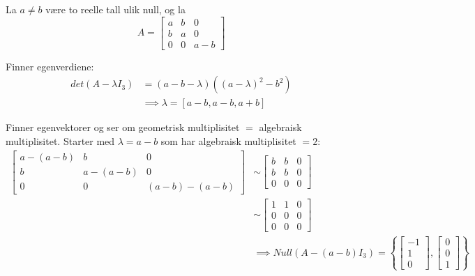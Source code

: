 \documentclass[11pt, a4paper, norsk]{NTNUoving}
\begin{document}
    \begin{oppgave}
        La $a \neq b$ være to reelle tall ulik null, og la $$A = \begin{bmatrix}
            a & b & 0 \\
            b & a & 0 \\
            0 & 0 & a-b
        \end{bmatrix}$$

        Finner egenverdiene:
        \begin{align*}
            det(A - \lambda I_3) &= (a-b-\lambda)((a-\lambda)^2 -b^2)
            \\
                                 &\implies \lambda = [a-b, a-b, a+b]
        \end{align*}
        
        Finner egenvektorer og ser om geometrisk multiplisitet $=$ algebraisk multiplisitet. Starter med $\lambda = a-b$ som har algebraisk multiplisitet $= 2$:
        \begin{align*}
            \begin{bmatrix}
                a-(a-b) & b & 0 \\
                b & a-(a-b) & 0 \\
                0 & 0 & (a-b)-(a-b)
            \end{bmatrix} &\sim \begin{bmatrix}
            b & b & 0 \\
            b & b & 0 \\
            0 & 0 & 0
            \end{bmatrix}
            \\
            &\sim \begin{bmatrix}
                1 & 1 & 0 \\
                0 & 0 & 0 \\
                0 & 0 & 0
            \end{bmatrix}
            \\
            &\implies Null(A - (a-b)I_3) = \left\{\begin{bmatrix}
                -1 \\
                1 \\
                0
            \end{bmatrix}, \begin{bmatrix}
                0 \\
                0 \\
                1
            \end{bmatrix}\right\}
        \end{align*}
        

\end{oppgave}
\end{document}
